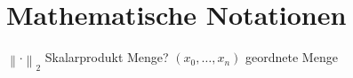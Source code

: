 \chapter*{Mathematische Notationen}
\label{mathematische_notationen}

$\left\|\cdot\right\|_2$
Skalarprodukt
Menge?
$\left(x_0, \ldots, x_n\right)$ geordnete Menge
